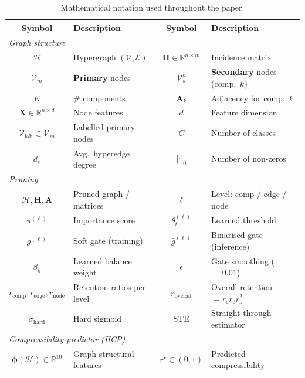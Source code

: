 \documentclass[10pt]{article}
\theoremstyle{plain}
\theoremstyle{definition}
\begin{document}
\begin{table}[ht!]
\centering
\caption{Mathematical notation used throughout the paper.}
\label{tab:notation}
\small
\setlength{\tabcolsep}{4pt}
\renewcommand{\arraystretch}{1.05}
\begin{tabular}{cl|cl}
\toprule
\textbf{Symbol} & \textbf{Description}
& \textbf{Symbol} & \textbf{Description} \\
\midrule
\multicolumn{4}{l}{\textit{Graph structure}} \\
$\mathcal{H}$ & Hypergraph $(\mathcal{V},\mathcal{E})$
  & $\mathbf{H}\!\in\!\mathbb{R}^{n\times m}$ & Incidence matrix \\
$\mathcal{V}_m$ & \textbf{Primary} nodes
  & $\mathcal{V}_s^{k}$ & \textbf{Secondary} nodes (comp.~$k$) \\
$K$ & \# components
  & $\mathbf{A}_k$ & Adjacency for comp.~$k$ \\
$\mathbf{X}\!\in\!\mathbb{R}^{n\times d}$ & Node features
  & $d$ & Feature dimension \\
$\mathcal{V}_{\mathrm{lab}}\!\subset\!\mathcal{V}_m$ & Labelled
  primary nodes
  & $C$ & Number of classes \\
$\bar{d}_e$ & Avg.\ hyperedge degree
  & $|\cdot|_0$ & Number of non-zeros \\
\midrule
\multicolumn{4}{l}{\textit{Pruning}} \\
$\widetilde{\mathcal{H}},
\widetilde{\mathbf{H}},
\widetilde{\mathbf{A}}$ & Pruned graph / matrices
  & $\ell$ & Level: comp / edge / node \\
$\pi^{(\ell)}$ & Importance score
  & $\theta_t^{(\ell)}$ & Learned threshold \\
$g^{(\ell)}$ & Soft gate (training)
  & $\bar{g}^{(\ell)}$ & Binarised gate (inference) \\
$\beta_k$ & Learned balance weight
  & $\epsilon$ & Gate smoothing ($=0.01$) \\
$r_{\mathrm{comp}},r_{\mathrm{edge}},r_{\mathrm{node}}$
  & Retention ratios per level
  & $r_{\mathrm{overall}}$
  & Overall retention $\!=\!r_{\mathrm{c}}r_{\mathrm{e}}r_{\mathrm{n}}^{2}$ \\
$\sigma_{\mathrm{hard}}$ & Hard sigmoid
  & STE & Straight-through estimator \\
\midrule
\multicolumn{4}{l}{\textit{Compressibility predictor (HCP)}} \\
$\boldsymbol{\phi}(\mathcal{H})\!\in\!\mathbb{R}^{10}$ &
  Graph structural features
  & $r^{\star}\!\in\!(0,1)$ & Predicted compressibility \\

\end{tabular}
\end{table}
\end{document}
